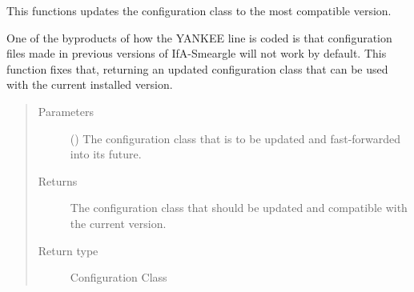 \documentclass[letterpaper,10pt,english]{sphinxmanual}
\begin{document}

\begin{fulllineitems}
\label{\detokenize{python_docstrings/IfA_Smeargle.yankee.yankee_functions:IfA_Smeargle.yankee.yankee_functions.yankee_fast_forward_configuration_class}}
This functions updates the configuration class to the most compatible
version.

One of the byproducts of how the YANKEE line is coded is that
configuration files made in previous versions of IfA-Smeargle will not
work by default. This function fixes that, returning an updated
configuration class that can be used with the current installed version.
\begin{quote}\begin{description}
\item[{Parameters}] \leavevmode
{} () \textendash{} The configuration class that is to be updated and fast-forwarded into
its future.

\item[{Returns}] \leavevmode
{} \textendash{} The configuration class that should be updated and compatible with
the current version.

\item[{Return type}] \leavevmode
Configuration Class

\end{description}\end{quote}

\end{fulllineitems}

\end{document}
